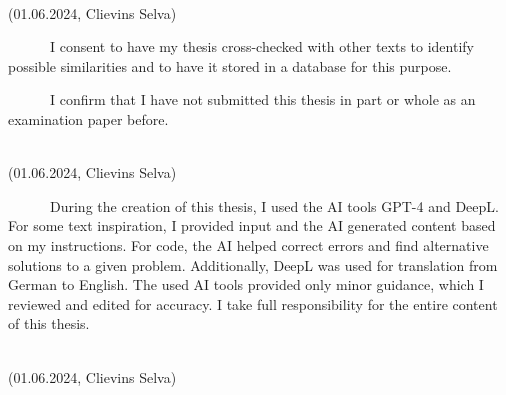 \documentclass[
  man,floatsintext]{apa7}
\begin{document}
\begin{flushleft}
\underline{\hspace{10cm}} \\ %
(01.06.2024, Clievins Selva)
\end{flushleft}

~~~~~~I consent to have my thesis cross-checked with other texts to identify possible similarities and to have it stored in a database for this purpose.

~~~~~~I confirm that I have not submitted this thesis in part or whole as an examination paper before.

\begin{flushleft}
\underline{\hspace{10cm}} \\ %
(01.06.2024, Clievins Selva)
\end{flushleft}

~~~~~~During the creation of this thesis, I used the AI tools GPT-4 and DeepL. For some text inspiration, I provided input and the AI generated content based on my instructions. For code, the AI helped correct errors and find alternative solutions to a given problem. Additionally, DeepL was used for translation from German to English. The used AI tools provided only minor guidance, which I reviewed and edited for accuracy. I take full responsibility for the entire content of this thesis.

\begin{flushleft}
\underline{\hspace{10cm}} \\ %
(01.06.2024, Clievins Selva)
\end{flushleft}
\end{document}
